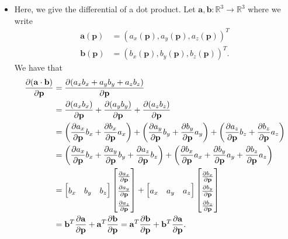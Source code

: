 \documentclass[10pt]{article}
\newcommand{\ve}[1]{\mathbf{#1}}
\newcommand{\ra}{\rightarrow}
\newcommand{\Real}{\mathbb{R}}
\begin{document}
\begin{itemize}
    \item Here, we give the differential of a dot product. Let $\ve{a}, \ve{b} : \Real^3 \ra \Real^3$ where we write 
    \begin{align*}
      \ve{a}(\ve{p}) &= (a_x(\ve{p}), a_y(\ve{p}), a_z(\ve{p}))^T\\
      \ve{b}(\ve{p}) &= (b_x(\ve{p}), b_y(\ve{p}), b_z(\ve{p}))^T.
    \end{align*}
    We have that      
    \begin{align*}
      \renewcommand{\arraystretch}{1.5}
      \frac{\partial (\ve{a} \cdot \ve{b})}{\partial \ve{p}}
      &= \frac{\partial (a_x b_x + a_y b_y + a_z b_z)}{\partial \ve{p}}\\
      &= \frac{\partial (a_x b_x)}{\partial \ve{p}} + \frac{\partial (a_y b_y)}{\partial \ve{p}} + \frac{\partial (a_z b_z)}{\partial \ve{p}}\\
      &= \bigg( \frac{\partial a_x}{\partial \ve{p}} b_x + \frac{\partial b_x}{\partial \ve{p}} a_x \bigg) 
      + \bigg( \frac{\partial a_y}{\partial \ve{p}} b_y + \frac{\partial b_y}{\partial \ve{p}} a_y \bigg)
      + \bigg( \frac{\partial a_z}{\partial \ve{p}} b_z + \frac{\partial b_z}{\partial \ve{p}} a_z \bigg)\\
      &= \bigg( \frac{\partial a_x}{\partial \ve{p}} b_x + \frac{\partial a_y}{\partial \ve{p}} b_y + \frac{\partial a_z}{\partial \ve{p}} b_z \bigg) +
      \bigg( \frac{\partial b_x}{\partial \ve{p}} a_x + \frac{\partial b_y}{\partial \ve{p}} a_y + \frac{\partial b_z}{\partial \ve{p}} a_z \bigg)\\
      &= \begin{bmatrix} b_x & b_y & b_z\end{bmatrix} \begin{bmatrix} \frac{\partial a_x}{\partial \ve{p}} \\ \frac{\partial a_y}{\partial \ve{p}} \\ \frac{\partial a_z}{\partial \ve{p}} \end{bmatrix} 
      + \begin{bmatrix} a_x & a_y & a_z\end{bmatrix} \begin{bmatrix} \frac{\partial b_x}{\partial \ve{p}} \\ \frac{\partial b_y}{\partial \ve{p}} \\ \frac{\partial b_z}{\partial \ve{p}} \end{bmatrix}\\
      &= \ve{b}^T \frac{\partial \ve{a}}{\partial \ve{p}} + \ve{a}^T \frac{\partial \ve{b}}{\partial \ve{p}}
      = \ve{a}^T \frac{\partial \ve{b}}{\partial \ve{p}} + \ve{b}^T \frac{\partial \ve{a}}{\partial \ve{p}}.
    \end{align*}    
    

\end{itemize}
\end{document}
